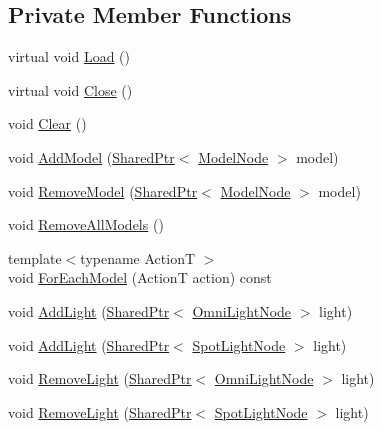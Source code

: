 \subsection*{Private Member Functions}
\begin{DoxyCompactItemize}
\item 
virtual void \hyperlink{classmage_1_1_scene_a1fb4a93eaa2f6a9e20594e205abb9a32}{Load} ()
\item 
virtual void \hyperlink{classmage_1_1_scene_a16786d7fcf0b813e2e94061b082cfd1d}{Close} ()
\item 
void \hyperlink{classmage_1_1_scene_a916cc7a0867bf1c09e5d10de53192140}{Clear} ()
\item 
void \hyperlink{classmage_1_1_scene_acfd5cf0484e1814cb265604ed970335f}{Add\+Model} (\hyperlink{namespacemage_a1e01ae66713838a7a67d30e44c67703e}{Shared\+Ptr}$<$ \hyperlink{classmage_1_1_model_node}{Model\+Node} $>$ model)
\item 
void \hyperlink{classmage_1_1_scene_a1b66a3d247eaa143234d15d72aa67a85}{Remove\+Model} (\hyperlink{namespacemage_a1e01ae66713838a7a67d30e44c67703e}{Shared\+Ptr}$<$ \hyperlink{classmage_1_1_model_node}{Model\+Node} $>$ model)
\item 
void \hyperlink{classmage_1_1_scene_a5dffc6ff3e40981087cbfc2462e5b84a}{Remove\+All\+Models} ()
\item 
{\footnotesize template$<$typename ActionT $>$ }\\void \hyperlink{classmage_1_1_scene_a6327548021f874f22a1adc81cfc8a1ea}{For\+Each\+Model} (ActionT action) const
\item 
void \hyperlink{classmage_1_1_scene_a6ce8182afe3c1f39249ec08b62aee317}{Add\+Light} (\hyperlink{namespacemage_a1e01ae66713838a7a67d30e44c67703e}{Shared\+Ptr}$<$ \hyperlink{namespacemage_a85082c7e15a2bbf19b1753b7de6c45db}{Omni\+Light\+Node} $>$ light)
\item 
void \hyperlink{classmage_1_1_scene_aeeba74ee789d4917ed72b179f16c1222}{Add\+Light} (\hyperlink{namespacemage_a1e01ae66713838a7a67d30e44c67703e}{Shared\+Ptr}$<$ \hyperlink{namespacemage_a46c8f54b869a5dc07f520c600b9046bd}{Spot\+Light\+Node} $>$ light)
\item 
void \hyperlink{classmage_1_1_scene_a1da46b19f87d387af18d2f7fc37bb6d7}{Remove\+Light} (\hyperlink{namespacemage_a1e01ae66713838a7a67d30e44c67703e}{Shared\+Ptr}$<$ \hyperlink{namespacemage_a85082c7e15a2bbf19b1753b7de6c45db}{Omni\+Light\+Node} $>$ light)
\item 
void \hyperlink{classmage_1_1_scene_a371c31d030990b9fa641271c4c733d87}{Remove\+Light} (\hyperlink{namespacemage_a1e01ae66713838a7a67d30e44c67703e}{Shared\+Ptr}$<$ \hyperlink{namespacemage_a46c8f54b869a5dc07f520c600b9046bd}{Spot\+Light\+Node} $>$ light)

\end{DoxyCompactItemize}
